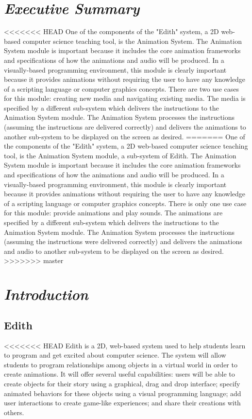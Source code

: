 \documentclass[12pt]{article}
\begin{document}
\section{\emph{Executive Summary}}
<<<<<<< HEAD
One of the components of the "Edith" system, a 2D web-based computer science teaching tool, is the Animation System. The Animation System module is important because it includes the core animation frameworks and specifications of how the animations and audio will be produced. In a visually-based programming environment, this module is clearly important because it provides animations without requiring the user to have any knowledge of a scripting language or computer graphics concepts. There are two use cases for this module: creating new media and navigating existing media. The media is specified by a different sub-system which delivers the instructions to the Animation System module. The Animation System processes the instructions (assuming the instructions are delivered correctly) and delivers the animations to another sub-system to be displayed on the screen as desired.
=======
One of the components of the "Edith" system, a 2D web-based computer science teaching tool, is the Animation System module, a sub-system of Edith. The Animation System module is important because it includes the core animation frameworks and specifications of how the animations and audio will be produced. In a visually-based programming environment, this module is clearly important because it provides animations without requiring the user to have any knowledge of a scripting language or computer graphics concepts. There is only one use case for this module: provide animations and play sounds. The animations are specified by a different sub-system which delivers the instructions to the Animation System module. The Animation System processes the instructions (assuming the instructions were delivered correctly) and delivers the animations and audio to another sub-system to be displayed on the screen as desired.
>>>>>>> master


\section{\emph{Introduction}}%
	\subsection{Edith}
<<<<<<< HEAD
         Edith is a 2D, web-based system used to help students learn to program and get excited about computer science. The system will allow students to program relationships among objects in a virtual world in order to create animations. It will offer several useful capabilities: users will be able to create objects for their story using a graphical, drag and drop interface; specify animated behaviors for these objects using a visual programming language; add user interactions to create game-like experiences; and share their creations with others. 
\end{document}

